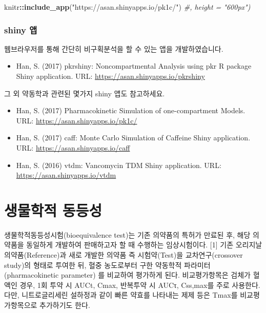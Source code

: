\documentclass[
  10pt,
]{krantz}
\makeatletter
\newenvironment{Shaded}{\begin{snugshade}}{\end{snugshade}}
\newcommand{\CommentTok}[1]{\textcolor[rgb]{0.56,0.35,0.01}{\textit{#1}}}
\newcommand{\KeywordTok}[1]{\textcolor[rgb]{0.13,0.29,0.53}{\textbf{#1}}}
\newcommand{\NormalTok}[1]{#1}
\newcommand{\OperatorTok}[1]{\textcolor[rgb]{0.81,0.36,0.00}{\textbf{#1}}}
\newcommand{\StringTok}[1]{\textcolor[rgb]{0.31,0.60,0.02}{#1}}
\providecommand{\tightlist}{%
  \setlength{\itemsep}{0pt}\setlength{\parskip}{0pt}}
\newenvironment{kframe}{%
\medskip{}
\setlength{\fboxsep}{.8em}
 \def\at@end@of@kframe{}%
 \ifinner\ifhmode%
  \def\at@end@of@kframe{\end{minipage}}%
  \begin{minipage}{\columnwidth}%
 \fi\fi%
 \def\FrameCommand##1{\hskip\@totalleftmargin \hskip-\fboxsep
 \colorbox{shadecolor}{##1}\hskip-\fboxsep
     \hskip-\linewidth \hskip-\@totalleftmargin \hskip\columnwidth}%
 \MakeFramed {\advance\hsize-\width
   \@totalleftmargin\z@ \linewidth\hsize
   \@setminipage}}%
 {\par\unskip\endMakeFramed%
 \at@end@of@kframe}
\renewenvironment{Shaded}{\begin{kframe}}{\end{kframe}}
\makeatother
\begin{document}
\begin{Shaded}
\begin{Highlighting}[]
\NormalTok{knitr}\OperatorTok{::}\KeywordTok{include\_app}\NormalTok{(}\StringTok{"https://asan.shinyapps.io/pk1c/"}\NormalTok{) }\CommentTok{\#, height = "600px")}
\end{Highlighting}
\end{Shaded}

\hypertarget{shiny}{%
\subsection{shiny 앱}\label{shiny}}

웹브라우저를 통해 간단히 비구획분석을 할 수 있는 앱을 개발하였습니다.

\begin{itemize}
\tightlist
\item
  Han, S. (2017) pkrshiny: Noncompartmental Analysis using pkr R package Shiny application. URL: \url{https://asan.shinyapps.io/pkrshiny}
\end{itemize}

그 외 약동학과 관련된 몇가지 shiny 앱도 참고하세요.

\begin{itemize}
\tightlist
\item
  Han, S. (2017) Pharmacokinetic Simulation of one-compartment Models. URL: \url{https://asan.shinyapps.io/pk1c/}
\item
  Han, S. (2017) caff: Monte Carlo Simulation of Caffeine Shiny application. URL: \url{https://asan.shinyapps.io/caff}
\item
  Han, S. (2016) vtdm: Vancomycin TDM Shiny application. URL: \url{https://asan.shinyapps.io/vtdm}
\end{itemize}

\hypertarget{bioequivalence}{%
\chapter{생물학적 동등성}\label{bioequivalence}}

생물학적동등성시험(bioequivalence test)는 기존 의약품의 특허가 만료된 후, 해당 의약품을 동일하게 개발하여 판매하고자 할 때 수행하는 임상시험이다. {[}1{]} 기존 오리지날 의약품(Reference)과 새로 개발한 의약품 즉 시험약(Test)을 교차연구(crossover study)의 형태로 투여한 뒤, 혈중 농도로부터 구한 약동학적 파라미터(pharmacokinetic parameter) 를 비교하여 평가하게 된다. 비교평가항목은 검체가 혈액인 경우, 1회 투약 시 AUCt, Cmax, 반복투약 시 AUCτ, Css,max를 주로 사용한다. 다만, 니트로글리세린 설하정과 같이 빠른 약효를 나타내는 제제 등은 Tmax를 비교평가항목으로 추가하기도 한다.
\end{document}
